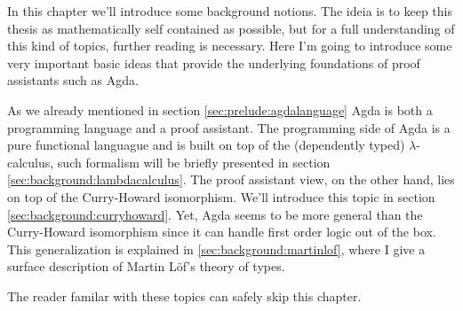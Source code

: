 In this chapter we'll introduce some background notions. The ideia is to keep this thesis as
mathematically self contained as possible, but for a full understanding of this kind of topics, further
reading is necessary. Here I'm going to introduce some very important basic ideas that provide
the underlying foundations of proof assistants such as Agda.

As we already mentioned in section \ref{sec:prelude:agdalanguage} Agda is both a programming language and a proof assistant. The programming side of Agda is a pure functional languague and is built on top of the (dependently typed) $\lambda$-calculus, such formalism will be briefly presented in section \ref{sec:background:lambdacalculus}. The proof assistant view, on the other hand, lies on top of the Curry-Howard isomorphism. We'll introduce this topic in section \ref{sec:background:curryhoward}. Yet, Agda seems to be
more general than the Curry-Howard isomorphism since it can handle first order logic out of the box. 
This generalization is explained in \ref{sec:background:martinlof}, where I give a surface description
of Martin L\"{o}f's theory of types.

The reader familar with these topics can safely skip this chapter. 
